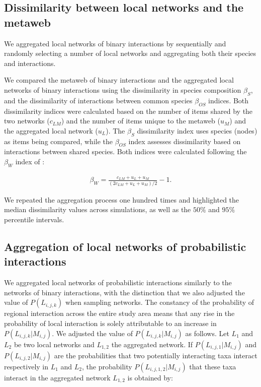 \begin{refsection}
\subsection{Dissimilarity between local networks and the metaweb}

We aggregated local networks of binary interactions by sequentially and randomly
selecting a number of local networks and aggregating both their species and
interactions. 

We compared the metaweb of binary interactions and the aggregated local networks
of binary interactions using the dissimilarity in species composition
$\beta_{S}$, and the dissimilarity of interactions between common species
$\beta_{OS}$ indices. Both dissimilarity indices were calculated based on the
number of items shared by the two networks ($c_{LM}$) and the number of items
unique to the metaweb ($u_M$) and the aggregated local network ($u_L$). The
$\beta_{S}$ dissimilarity index uses species (nodes) as items being compared,
while the $\beta_{OS}$ index assesses dissimilarity based on interactions
between shared species. Both indices were calculated following the $\beta_W$
index of \cite{Whittaker1960Vegetation}: 

\begin{eqnarray}
    \label{eq:betadiv_network}
    \beta_W = \frac{c_{LM} + u_L + u_M}{(2 c_{LM} + u_L + u_M) / 2} - 1.
\end{eqnarray}

We repeated the aggregation process one hundred times and highlighted the median
dissimilarity values across simulations, as well as the $50\%$ and $95\%$
percentile intervals. 

\subsection{Aggregation of local networks of probabilistic interactions}

We aggregated local networks of probabilistic interactions similarly to the
networks of binary interactions, with the distinction that we also adjusted the
value of $P(L_{i, j, k})$ when sampling networks. The constancy of the
probability of regional interaction across the entire study area means that any
rise in the probability of local interaction is solely attributable to an
increase in $P(L_{i, j, k}|M_{i, j})$. We adjusted the value of $P(L_{i, j,
k}|M_{i, j})$ as follows. Let $L_1$ and $L_2$ be two local networks and
$L_{1,2}$ the aggregated network. If $P(L_{i, j, 1}|M_{i, j})$ and $P(L_{i, j,
2}|M_{i, j})$ are the probabilities that two potentially interacting taxa
interact respectively in $L_1$ and $L_2$, the probability $P(L_{i, j, 1,2}|M_{i,
j})$ that these taxa interact in the aggregated network $L_{1,2}$ is obtained
by: 


\end{refsection}
